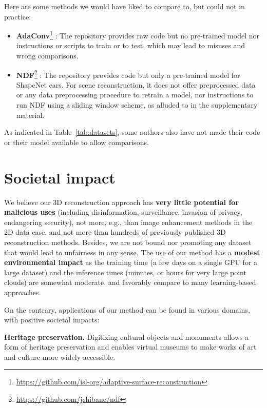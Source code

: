 \documentclass[10pt,twocolumn,letterpaper]{article}
\begin{document}
\medskip

Here are some methods we would have liked to compare to, but could not in practice:
\begin{itemize}[itemsep=-2pt,topsep=1pt]

\item \textbf{AdaConv}\footnote{\label{foot:adaconv}\url{https://github.com/isl-org/adaptive-surface-reconstruction}} \cite{Ummenhofer2021Adaptive}: The repository provides raw code but no pre-trained model nor instructions or scripts to train or to test, which may lead to misuses and wrong comparisons. 

\item \textbf{NDF}\footnote{\url{https://github.com/jchibane/ndf}} \cite{Chibane2020Neural}: The repository provides code but only a pre-trained model for ShapeNet cars. For scene reconstruction, it does not offer preprocessed data or any data preprocessing procedure to retrain a model, nor instructions to run NDF using a sliding window scheme, as alluded to in the supplementary material.

\end{itemize}
As indicated in Table~\ref{tab:datasets}, some authors also have not made their code or their model available to allow comparisons.


\section{Societal impact}

We believe our 3D reconstruction approach has \textbf{very little potential for malicious uses} (including disinformation, surveillance, invasion of privacy, endangering security), not more, e.g., than image enhancement methods in the 2D data case, and not more than hundreds of previously published 3D reconstruction methods. Besides, we are not bound nor promoting any dataset that would lead to unfairness in any sense. The use of our method has a \textbf{modest environmental impact} as the training time (a few days on a single GPU for a large dataset) and the inference times (minutes, or hours for very large point clouds) are somewhat moderate, and favorably compare to many learning-based approaches.

On the contrary, applications of our method can be found in various domains, with positive societal impacts:

\textbf{Heritage preservation.}
Digitizing cultural objects and monuments allows a form of heritage preservation and enables virtual museums to make works of art and culture more widely accessible.
    
\end{document}
